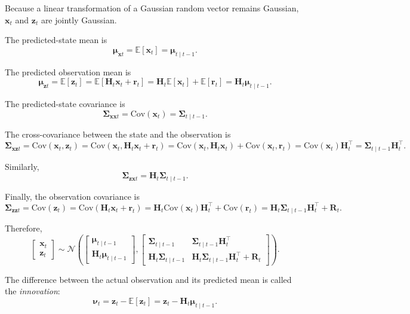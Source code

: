 \documentclass[../Bayesian_Inference.tex]{subfiles}
\begin{document}
Because a linear transformation of a Gaussian random vector remains Gaussian, $\bm{x}_t$ and $\bm{z}_t$ are jointly Gaussian.

The predicted-state mean is
\[
    \bm{\mu}_{\bm{x}t} = \mathbb{E}[\bm{x}_t] = \bm{\mu}_{t\mid t-1}.
\]

The predicted observation mean is
\[
    \bm{\mu}_{\bm{z}t} = \mathbb{E}[\bm{z}_t] = \mathbb{E}[\mathbf{H}_t\bm{x}_t+\bm{r}_t] = \mathbf{H}_t\mathbb{E}[\bm{x}_t]+\mathbb{E}[\bm{r}_t] = \mathbf{H}_t\bm{\mu}_{t\mid t-1}.
\]

The predicted-state covariance is
\[
    \mathbf{\Sigma}_{\bm{x}\bm{x}t} = \mathrm{Cov}(\bm{x}_t) = \mathbf{\Sigma}_{t\mid t-1}.
\]

The cross-covariance between the state and the observation is
\[
    \mathbf{\Sigma}_{\bm{x}\bm{z}t} = \mathrm{Cov}(\bm{x}_t,\bm{z}_t) = \mathrm{Cov}(\bm{x}_t,\mathbf{H}_t\bm{x}_t+\bm{r}_t) = \mathrm{Cov}(\bm{x}_t,\mathbf{H}_t\bm{x}_t) + \mathrm{Cov}(\bm{x}_t,\bm{r}_t) = \mathrm{Cov}(\bm{x}_t)\mathbf{H}_t^\top = \mathbf{\Sigma}_{t\mid t-1}\mathbf{H}_t^\top.
\]

Similarly,
\[
    \mathbf{\Sigma}_{\bm{z}\bm{x}t} = \mathbf{H}_t\mathbf{\Sigma}_{t\mid t-1}.
\]

Finally, the observation covariance is
\[
    \mathbf{\Sigma}_{\bm{z}\bm{z}t} = \mathrm{Cov}(\bm{z}_t) = \mathrm{Cov}(\mathbf{H}_t\bm{x}_t+\bm{r}_t) = \mathbf{H}_t\mathrm{Cov}(\bm{x}_t)\mathbf{H}_t^\top + \mathrm{Cov}(\bm{r}_t) = \mathbf{H}_t\mathbf{\Sigma}_{t\mid t-1}\mathbf{H}_t^\top + \mathbf{R}_t.
\]

Therefore,
\[
    \begin{bmatrix}
        \bm{x}_t \\
        \bm{z}_t
    \end{bmatrix}
    \sim
    \mathcal{N}\left(
        \begin{bmatrix}
            \bm{\mu}_{t\mid t-1} \\
            \mathbf{H}_t\bm{\mu}_{t\mid t-1}
        \end{bmatrix},
        \begin{bmatrix}
            \mathbf{\Sigma}_{t\mid t-1} & \mathbf{\Sigma}_{t\mid t-1}\mathbf{H}_t^\top \\
            \mathbf{H}_t\mathbf{\Sigma}_{t\mid t-1} & \mathbf{H}_t\mathbf{\Sigma}_{t\mid t-1}\mathbf{H}_t^\top + \mathbf{R}_t
        \end{bmatrix}
    \right).
\]

The difference between the actual observation and its predicted mean is called the \textit{innovation}:
\[
    \bm{\nu}_t =\bm{z}_t-\mathbb{E}[\bm{z}_t]=\bm{z}_t-\mathbf{H}_t\bm{\mu}_{t\mid t-1}.
\]
\end{document}
